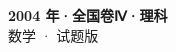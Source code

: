 \documentclass[zihao=-4, a4paper]{ctexart}
\begin{document}
\begin{center}
  {\Large\bfseries 2004 年·全国卷Ⅳ·理科}\\[4pt]
  {\large 数学 · 试题版}
\end{center}
\medskip
{}

\end{document}
